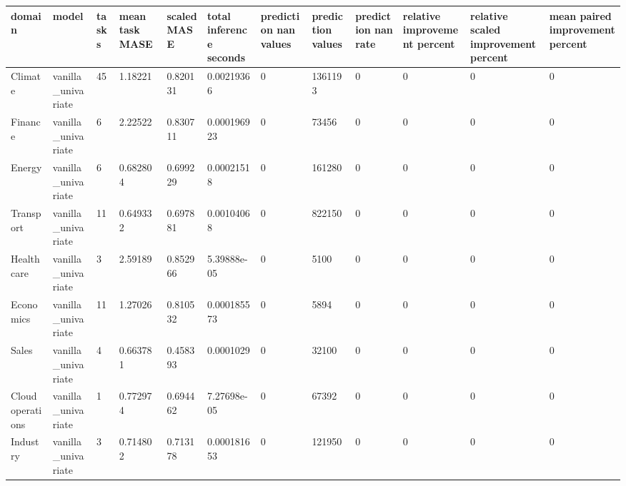 \begin{tabular}{llllllllllll}
\toprule
domain & model & tasks & mean task MASE & scaled MASE & total inference seconds & prediction nan values & prediction values & prediction nan rate & relative improvement percent & relative scaled improvement percent & mean paired improvement percent \\
\midrule
Climate & vanilla\_univariate & 45 & 1.18221 & 0.820131 & 0.00219366 & 0 & 1361193 & 0 & 0 & 0 & 0 \\
Finance & vanilla\_univariate & 6 & 2.22522 & 0.830711 & 0.000196923 & 0 & 73456 & 0 & 0 & 0 & 0 \\
Energy & vanilla\_univariate & 6 & 0.682804 & 0.699229 & 0.00021518 & 0 & 161280 & 0 & 0 & 0 & 0 \\
Transport & vanilla\_univariate & 11 & 0.649332 & 0.697881 & 0.00104068 & 0 & 822150 & 0 & 0 & 0 & 0 \\
Healthcare & vanilla\_univariate & 3 & 2.59189 & 0.852966 & 5.39888e-05 & 0 & 5100 & 0 & 0 & 0 & 0 \\
Economics & vanilla\_univariate & 11 & 1.27026 & 0.810532 & 0.000185573 & 0 & 5894 & 0 & 0 & 0 & 0 \\
Sales & vanilla\_univariate & 4 & 0.663781 & 0.458393 & 0.0001029 & 0 & 32100 & 0 & 0 & 0 & 0 \\
Cloud operations & vanilla\_univariate & 1 & 0.772974 & 0.694462 & 7.27698e-05 & 0 & 67392 & 0 & 0 & 0 & 0 \\
Industry & vanilla\_univariate & 3 & 0.714802 & 0.713178 & 0.000181653 & 0 & 121950 & 0 & 0 & 0 & 0 \\
\bottomrule
\end{tabular}
